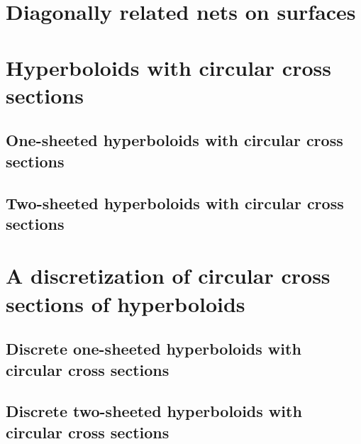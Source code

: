\documentclass[12pt,a4paper]{article}
\theoremstyle{definition}
\theoremstyle{remark}
\begin{document}
\section{Diagonally related nets on surfaces}
\pagebreak
\section{Hyperboloids with circular cross sections}
\subsection{One-sheeted hyperboloids with circular cross sections}
\subsection{Two-sheeted hyperboloids with circular cross sections}
\pagebreak
\section{A discretization of circular cross sections of hyperboloids}
\subsection{Discrete one-sheeted hyperboloids with circular cross sections}
\cite{DiscretizationConfocalQuadricsI}
\subsection{Discrete two-sheeted hyperboloids with circular cross sections}
\pagebreak


\pagestyle{tocstyle}


\end{document}
